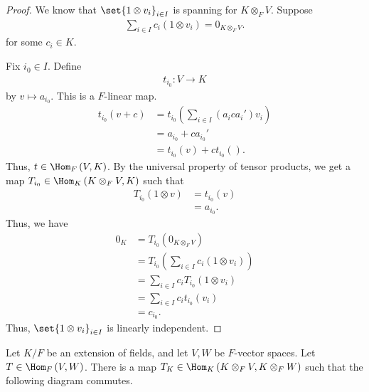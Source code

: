 \documentclass[10pt]{mypackage}
\begin{document}
  \begin{proof}
    We know that $\set{1\otimes v_i}_{i\in I}$ is spanning for $K\otimes_{F}V$. Suppose
    \begin{align*}
      \sum_{i\in I}c_i\left(1\otimes v_i\right) = 0_{K\otimes_{F}V}.
    \end{align*}
    for some $c_i\in K$.\newline

    Fix $i_0\in I$. Define
    \begin{align*}
      t_{i_0}: V \rightarrow K
    \end{align*}
    by $v\mapsto a_{i_0}$. This is a $F$-linear map.
    \begin{align*}
      t_{i_0}\left(v + c\right) &= t_{i_0}\left(\sum_{i\in I}\left(a_ica_i'\right) v_i\right)\\
                                  &= a_{i_0} + ca_{i_0}'\\
                                  &= t_{i_0}\left(v\right) + ct_{i_0}\left(\right).
    \end{align*}
    Thus, $t\in \Hom_{F}\left(V,K\right)$. By the universal property of tensor products, we get a map $T_{i_0}\in \Hom_{K}\left(K\otimes_{F}V,K\right)$ such that
    \begin{align*}
      T_{i_0}\left(1\otimes v\right) &= t_{i_0}\left(v\right)\\
                                     &= a_{i_0}.
    \end{align*}
    Thus, we have
    \begin{align*}
      0_{K} &= T_{i_0}\left(0_{K\otimes_{F}V}\right)\\
            &= T_{i_0}\left(\sum_{i\in I}c_i\left(1\otimes v_i\right)\right)\\
            &= \sum_{i\in I}c_iT_{i_0}\left(1\otimes v_i\right)\\
            &= \sum_{i\in I}c_it_{i_0}\left(v_i\right)\\
            &= c_{i_0}.
    \end{align*}
    Thus, $\set{1\otimes v_{i}}_{i\in I}$ is linearly independent.
  \end{proof}
  \begin{theorem}
    Let $K/F$ be an extension of fields, and let $V,W$ be $F$-vector spaces. Let $T\in \Hom_{F}\left(V,W\right)$. There is a map $T_{K}\in \Hom_{K}\left(K\otimes_{F}V,K\otimes_{F}W\right)$ such that the following diagram commutes.
    \begin{center}
    \end{center}
  \end{theorem}
\end{document}
